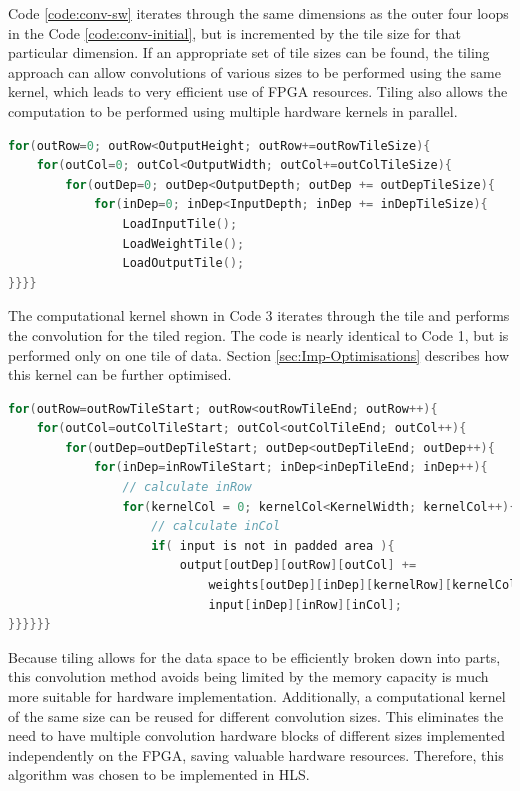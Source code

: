 \documentclass[12pt]{article}
\begin{document}
Code \ref{code:conv-sw} iterates through the same dimensions as the outer four loops in the Code \ref{code:conv-initial}, but is incremented by the tile size for that particular dimension. If an appropriate set of tile sizes can be found, the tiling approach can allow convolutions of various sizes to be performed using the same kernel, which leads to very efficient use of FPGA resources. Tiling also allows the computation to be performed using multiple hardware kernels in parallel.

\renewcommand{\lstlistingname}{Code}
\begin{lstlisting}[caption=External Data Transfer, label=code:conv-sw, language=C, float=ht]
for(outRow=0; outRow<OutputHeight; outRow+=outRowTileSize){
	for(outCol=0; outCol<OutputWidth; outCol+=outColTileSize){
		for(outDep=0; outDep<OutputDepth; outDep += outDepTileSize){
			for(inDep=0; inDep<InputDepth; inDep += inDepTileSize){
				LoadInputTile();
				LoadWeightTile();
				LoadOutputTile();
}}}}
\end{lstlisting} 

The computational kernel shown in Code 3 iterates through the tile and performs the convolution for the tiled region. The code is nearly identical to Code 1, but is performed only on one tile of data. Section \ref{sec:Imp-Optimisations} describes how this kernel can be further optimised.

\renewcommand{\lstlistingname}{Code}
\begin{lstlisting}[caption=Computational Kernel, label=code:conv-hw1, language=C, float=ht]
for(outRow=outRowTileStart; outRow<outRowTileEnd; outRow++){
	for(outCol=outColTileStart; outCol<outColTileEnd; outCol++){
		for(outDep=outDepTileStart; outDep<outDepTileEnd; outDep++){
			for(inDep=inRowTileStart; inDep<inDepTileEnd; inDep++){
				// calculate inRow
				for(kernelCol = 0; kernelCol<KernelWidth; kernelCol++){
					// calculate inCol
					if( input is not in padded area ){
						output[outDep][outRow][outCol] +=
							weights[outDep][inDep][kernelRow][kernelCol] *
							input[inDep][inRow][inCol];
}}}}}}
\end{lstlisting} 

Because tiling allows for the data space to be efficiently broken down into parts, this convolution method avoids being limited by the memory capacity is much more suitable for hardware implementation. Additionally, a computational kernel of the same size can be reused for different convolution sizes. This eliminates the need to have multiple convolution hardware blocks of different sizes implemented independently on the FPGA, saving valuable hardware resources. Therefore, this algorithm was chosen to be implemented in HLS.
\end{document}
